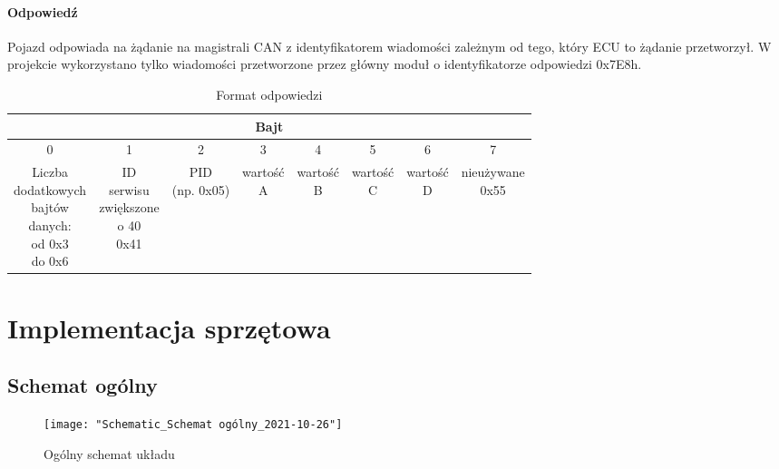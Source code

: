 \documentclass[10pt,a4paper]{scrartcl}
\begin{document}
		\paragraph{Odpowiedź}
		Pojazd odpowiada na żądanie na magistrali CAN z identyfikatorem wiadomości zależnym od tego, który ECU to żądanie przetworzył. W projekcie wykorzystano tylko wiadomości przetworzone przez główny moduł o identyfikatorze odpowiedzi 0x7E8h. 
			\begin{table}[H]
			\caption{Format odpowiedzi}
			\begin{center}
				\begin{tabular}{|c|c|c|c|c|c|c|c|}
					\hline
					\multicolumn{8}{|c|}{Bajt}\\
					\hline
					0&1&2&3&4&5&6&7\\
					\hline
					\makecell{Liczba \\dodatkowych \\bajtów \\danych:\\ od 0x3\\do 0x6}&\makecell{ID\\serwisu\\ zwiększone\\ o 40\\ 0x41}&\makecell{PID \\(np. 0x05)}
					&\makecell{wartość\\A}&\makecell{wartość\\ B}&\makecell{wartość\\ C} & \makecell{wartość\\ D} &\makecell{nieużywane\\ 0x55}\\
					\hline
				\end{tabular}
			\end{center}
			\label{tab:odpowiedź}
		\end{table}
	
	\section{Implementacja sprzętowa}
	\subsection{Schemat ogólny}
	\begin{figure}[H]
		\centering
		\texttt{[image: "Schematic\_Schemat ogólny\_2021-10-26"]}
		\caption[Schemat układu]{Ogólny schemat układu}
		\label{fig:schemat_układu}
	\end{figure}
\end{document}
